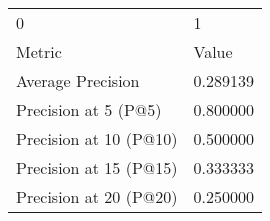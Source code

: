 \begin{tabular}{ll}
0 & 1 \\
Metric & Value \\
Average Precision & 0.289139 \\
Precision at 5 (P@5) & 0.800000 \\
Precision at 10 (P@10) & 0.500000 \\
Precision at 15 (P@15) & 0.333333 \\
Precision at 20 (P@20) & 0.250000 \\
\end{tabular}
